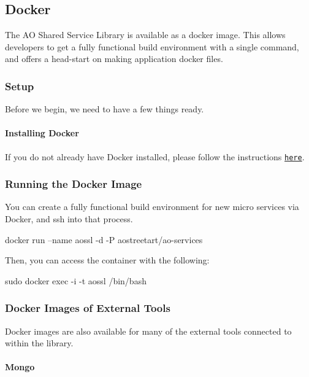 \subsection*{Docker}

The AO Shared Service Library is available as a docker image. This allows developers to get a fully functional build environment with a single command, and offers a head-\/start on making application docker files.

\subsubsection*{Setup}

Before we begin, we need to have a few things ready.

\paragraph*{Installing Docker}

If you do not already have Docker installed, please follow the instructions \href{https://docs.docker.com/engine/installation}{\tt here}.

\subsubsection*{Running the Docker Image}

You can create a fully functional build environment for new micro services via Docker, and ssh into that process. \begin{DoxyVerb}docker run --name aossl -d -P aostreetart/ao-services
\end{DoxyVerb}


Then, you can access the container with the following\+: \begin{DoxyVerb}sudo docker exec -i -t aossl /bin/bash
\end{DoxyVerb}


\subsubsection*{Docker Images of External Tools}

Docker images are also available for many of the external tools connected to within the library.

\paragraph*{Mongo}

